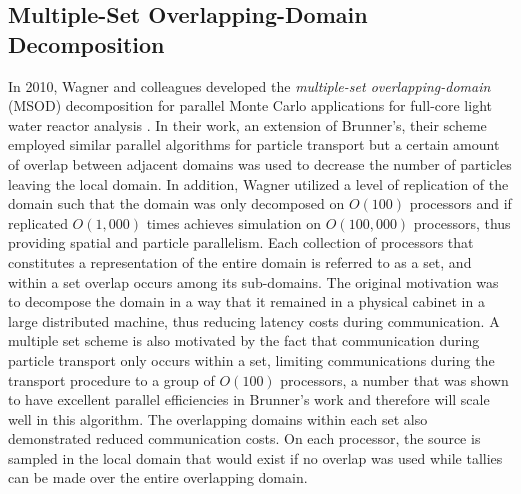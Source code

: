 \subsection{Multiple-Set Overlapping-Domain Decomposition}
\label{subsec:msod}
In 2010, Wagner and colleagues developed the \textit{multiple-set
  overlapping-domain} (MSOD) decomposition for parallel Monte Carlo
applications for full-core light water reactor analysis
\citep{wagner_hybrid_2010}. In their work, an extension of Brunner's,
their scheme employed similar parallel algorithms for particle
transport but a certain amount of overlap between adjacent domains was
used to decrease the number of particles leaving the local domain. In
addition, Wagner utilized a level of replication of the domain such
that the domain was only decomposed on $O(100)$ processors and if
replicated $O(1,000)$ times achieves simulation on $O(100,000)$
processors, thus providing spatial and particle parallelism. Each
collection of processors that constitutes a representation of the
entire domain is referred to as a set, and within a set overlap occurs
among its sub-domains. The original motivation was to decompose the
domain in a way that it remained in a physical cabinet in a large
distributed machine, thus reducing latency costs during
communication. A multiple set scheme is also motivated by the fact
that communication during particle transport only occurs within a set,
limiting communications during the transport procedure to a group of
$O(100)$ processors, a number that was shown to have excellent
parallel efficiencies in Brunner's work and therefore will scale well
in this algorithm. The overlapping domains within each set also
demonstrated reduced communication costs. On each processor, the
source is sampled in the local domain that would exist if no overlap
was used while tallies can be made over the entire overlapping domain.

